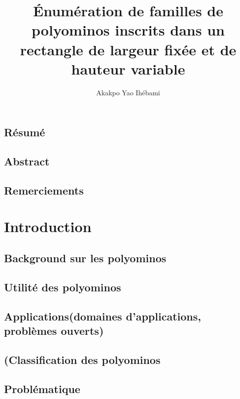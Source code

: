 \documentclass[12pt]{memoireuqam1.3}
\begin{document}
\title{Énumération de familles de polyominos inscrits dans un rectangle de largeur fixée et de hauteur variable}
\author{Akakpo Yao Ihébami}
\uqammemoire %
{}


\thispagestyle{empty}        %
\maketitle

\section*{Résumé}
\newpage
\section*{Abstract}
\newpage
\section*{Remerciements}
\chapter{Introduction}
\section{Background sur les polyominos}
\section{Utilité des polyominos}
\section{Applications(domaines d'applications, problèmes ouverts)}
\section{(Classification des polyominos}
\section{Problématique}
\end{document}
